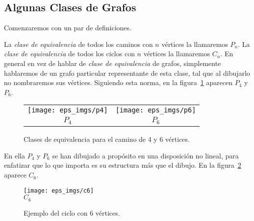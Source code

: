 \subsection{Algunas Clases de Grafos}

Comenzaremos con un par de definiciones.

\begin{definicion}
La \emph{clase de equivalencia} de todos los caminos con $n$ vértices la llamaremos $P_n$. 
La \emph{clase de equivalencia} de todos los ciclos con $n$ vértices la llamaremos $C_n$.
En general en vez de hablar de \emph{clase de equivalencia} de grafos, simplemente hablaremos de un grafo particular representante de esta clase, tal que al dibujarlo no nombraremos sus vértices.
Siguiendo esta norma, en la figura~\ref{fig:paths} aparecen $P_4$ y $P_6$.
\begin{figure}[h!]
\centering
\begin{tabular}{cc}
\texttt{[image: eps\_imgs/p4]}\hspace*{3em} &  \texttt{[image: eps\_imgs/p6]} \\
$P_4$\hspace*{3em} & $P_6$
\end{tabular}
\caption{Clases de equivalencia para el camino de 4 y 6 vértices.}
\label{fig:paths}
\end{figure}
En ella $P_4$ y $P_6$ se han dibujado a propósito en una disposición no lineal, para enfatizar que lo que importa es su estructura más que el dibujo.
En la figura~\ref{fig:cycle} aparece $C_6$.
\begin{figure}[h!]
\centering
\texttt{[image: eps\_imgs/c6]}\\
$C_6$
\caption{Ejemplo del ciclo con 6 vértices.}
\label{fig:cycle}
\end{figure}
\end{definicion}

